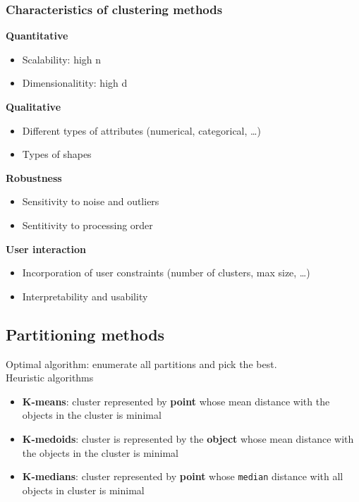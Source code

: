 \subsubsection{Characteristics of clustering methods}

\textbf{Quantitative}
\begin{itemize}
\item Scalability: high n
\item Dimensionalitity: high d
\end{itemize}

\textbf{Qualitative}
\begin{itemize}
\item Different types of attributes (numerical, categorical, \ldots)
\item Types of shapes
\end{itemize}

\textbf{Robustness}
\begin{itemize}
\item Sensitivity to noise and outliers
\item Sentitivity to processing order
\end{itemize}

\textbf{User interaction}
\begin{itemize}
\item Incorporation of user constraints (number of clusters, max size,
  \ldots)
\item Interpretability and usability
\end{itemize}

\subsection{Partitioning methods}
Optimal algorithm: enumerate all partitions and pick the best. \\
Heuristic algorithms
\begin{itemize}
\item \textbf{K-means}: cluster represented by \textbf{point}
  whose mean distance with the objects in the cluster is minimal
\item \textbf{K-medoids}: cluster is represented by the
  \textbf{object} whose mean distance with the objects in the cluster
  is minimal
\item \textbf{K-medians}: cluster represented by \textbf{point} whose
  \texttt{median}  distance with all objects in cluster is minimal
\end{itemize}

